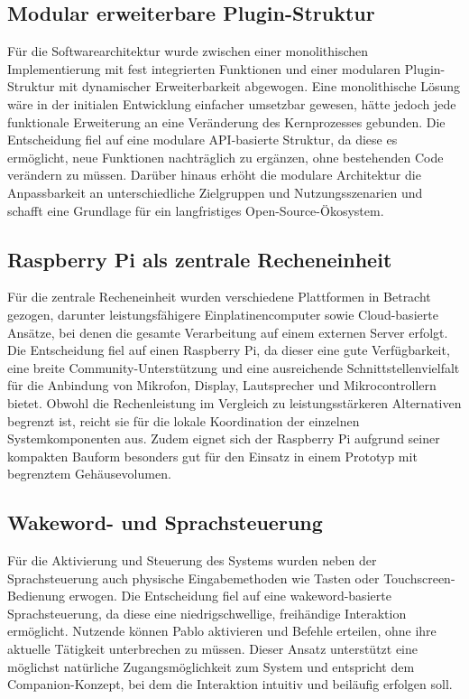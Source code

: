 \subsection{Modular erweiterbare Plugin-Struktur}

Für die Softwarearchitektur wurde zwischen einer monolithischen Implementierung mit fest integrierten Funktionen und einer modularen Plugin-Struktur mit dynamischer Erweiterbarkeit abgewogen.
Eine monolithische Lösung wäre in der initialen Entwicklung einfacher umsetzbar gewesen, hätte jedoch jede funktionale Erweiterung an eine Veränderung des Kernprozesses gebunden.
Die Entscheidung fiel auf eine modulare API-basierte Struktur, da diese es ermöglicht, neue Funktionen nachträglich zu ergänzen, ohne bestehenden Code verändern zu müssen.
Darüber hinaus erhöht die modulare Architektur die Anpassbarkeit an unterschiedliche Zielgruppen und Nutzungsszenarien und schafft eine Grundlage für ein langfristiges Open-Source-Ökosystem.

\subsection{Raspberry Pi als zentrale Recheneinheit}

Für die zentrale Recheneinheit wurden verschiedene Plattformen in Betracht gezogen, darunter leistungsfähigere Einplatinencomputer sowie Cloud-basierte Ansätze, bei denen die gesamte Verarbeitung auf einem externen Server erfolgt.
Die Entscheidung fiel auf einen Raspberry Pi, da dieser eine gute Verfügbarkeit, eine breite Community-Unterstützung und eine ausreichende Schnittstellenvielfalt für die Anbindung von Mikrofon, Display, Lautsprecher und Mikrocontrollern bietet.
Obwohl die Rechenleistung im Vergleich zu leistungsstärkeren Alternativen begrenzt ist, reicht sie für die lokale Koordination der einzelnen Systemkomponenten aus.
Zudem eignet sich der Raspberry Pi aufgrund seiner kompakten Bauform besonders gut für den Einsatz in einem Prototyp mit begrenztem Gehäusevolumen.

\subsection{Wakeword- und Sprachsteuerung}

Für die Aktivierung und Steuerung des Systems wurden neben der Sprachsteuerung auch physische Eingabemethoden wie Tasten oder Touchscreen-Bedienung erwogen.
Die Entscheidung fiel auf eine wakeword-basierte Sprachsteuerung, da diese eine niedrigschwellige, freihändige Interaktion ermöglicht.
Nutzende können Pablo aktivieren und Befehle erteilen, ohne ihre aktuelle Tätigkeit unterbrechen zu müssen.
Dieser Ansatz unterstützt eine möglichst natürliche Zugangsmöglichkeit zum System und entspricht dem Companion-Konzept, bei dem die Interaktion intuitiv und beiläufig erfolgen soll.

